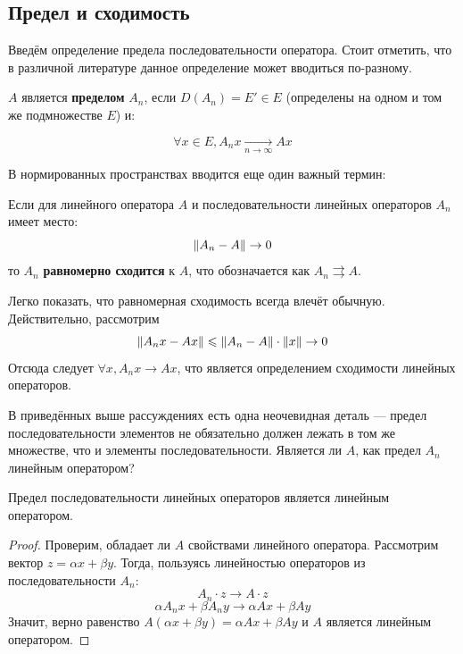 \documentclass[12pt]{article}
\begin{document}
	\subsection{Предел и сходимость}

		Введём определение предела последовательности оператора. Стоит отметить, что в различной литературе данное определение может вводиться
		по-разному.
	
		\begin{defi}
			$A$ является \textbf{пределом} $A_n$, если $D(A_n)=E' \in E$ (определены на одном и том же подмножестве $E$) и:
		
			$$\forall x \in E, A_n x \underset{n \rightarrow \infty}{\rightarrow} A x$$
		\end{defi}
		В нормированных пространствах вводится еще один 
		важный термин:
	
		\begin{defi}
			Если для линейного оператора $A$ и последовательности линейных операторов $A_n$ имеет место:
			$$\left\| A_n - A \right\| \rightarrow 0$$
			то $A_n$ \textbf{равномерно сходится} к $A$, что обозначается как $A_n \rightrightarrows A$.
		\end{defi}
	
		Легко показать, что равномерная сходимость всегда влечёт обычную. Действительно, рассмотрим
		$$\left\| A_n x - A x \right\| \leqslant \left\| A_n - A \right\| \cdot \left\| x \right\| \rightarrow 0$$
		Отсюда следует $\forall x, A_n x \rightarrow A x$, что является определением сходимости линейных операторов.
	
		В приведённых выше рассуждениях есть одна неочевидная деталь --- предел последовательности элементов не обязательно должен лежать
		в том же множестве, что и элементы последовательности. Является ли $A$, как предел $A_n$ линейным оператором?
	
		\begin{state}
			Предел последовательности линейных операторов является линейным оператором.
		\end{state}
		\begin{proof}
			Проверим, обладает ли $A$ свойствами линейного оператора. Рассмотрим вектор $z = \alpha x + \beta y$. 
			Тогда, пользуясь линейностью операторов из последовательности $A_n$:
			$$ A_n \cdot z \rightarrow A \cdot z $$
			$$ \alpha A_n x + \beta A_n y \rightarrow \alpha A x + \beta A y $$
			Значит, верно равенство $A(\alpha x + \beta y) = \alpha A x + \beta A y$ и $A$ является линейным оператором.
		\end{proof}
	
\end{document}
